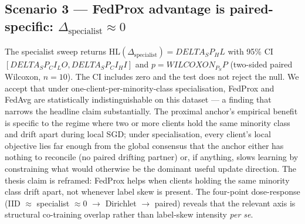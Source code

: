 \subsection*{Scenario 3 — FedProx advantage is paired-specific:
$\Delta_{\mathrm{specialist}} \approx 0$}
The specialist sweep returns $\mathrm{HL}(\Delta_{\mathrm{specialist}}) =
{DELTA_SP_HL}$ with 95\% CI $[{DELTA_SP_CI_LO}, {DELTA_SP_CI_HI}]$ and
$p = {WILCOXON_P_SP}$ (two-sided paired Wilcoxon, $n=10$). The CI
includes zero and the test does not reject the null. We accept that
under one-client-per-minority-class specialisation, FedProx and FedAvg
are statistically indistinguishable on this dataset --- a finding that
narrows the headline claim substantially. The proximal anchor's
empirical benefit is specific to the regime where two or more clients
hold the same minority class and drift apart during local SGD; under
specialisation, every client's local objective lies far enough from
the global consensus that the anchor either has nothing to reconcile
(no paired drifting partner) or, if anything, slows learning by
constraining what would otherwise be the dominant useful update
direction. The thesis claim is reframed: FedProx helps when clients
holding the same minority class drift apart, not whenever label skew
is present. The four-point dose-response (IID $\approx$ specialist
$\approx 0$ $\to$ Dirichlet $\to$ paired) reveals that the relevant
axis is structural co-training overlap rather than label-skew intensity
\emph{per se}.

